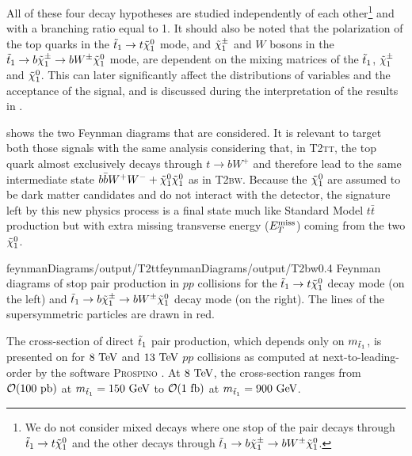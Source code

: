     All of these four decay hypotheses are studied independently
    of each other\footnote{We do not consider mixed decays where one stop of the pair
    decays through $\tilde{t}_1 \rightarrow t \tilde{\chi}_1^0$ and the other decays through
    $\tilde{t}_1 \rightarrow b \tilde{\chi}_1^\pm \rightarrow b W^{\pm} \tilde{\chi}_1^0$.} and with a
    branching ratio equal to 1. It should also be noted that the polarization of the
    top quarks in the $\tilde{t}_1 \rightarrow t \tilde{\chi}_1^0$ mode, and $\tilde{\chi}_1^\pm$ and
    $W$ bosons in the $\tilde{t}_1 \rightarrow b \tilde{\chi}_1^\pm \rightarrow b W^{\pm}
    \tilde{\chi}_1^0$ mode, are dependent on the mixing matrices of the $\tilde{t}_1$, $\tilde{\chi}_1^\pm$
    and $\tilde{\chi}_1^0$. This can later significantly affect the distributions of
    variables and the acceptance of the signal, and is discussed during the
    interpretation of the results in .

     shows the two Feynman diagrams that are
    considered. It is relevant to target both those signals with the same analysis
    considering that, in \textsc{T2tt}, the top quark almost exclusively decays
    through $t \rightarrow b W^+$ and therefore lead to the same intermediate state
    $b \bar{b} W^+ W^- + \tilde{\chi}_1^0 \tilde{\chi}_1^0$ as in \textsc{T2bw}. Because the
    $\tilde{\chi}_1^0$ are assumed to be dark matter candidates and do not interact with
    the detector, the signature left by this new physics process is a final state much
    like Standard Model $t\bar{t}$ production but with extra missing transverse energy
    ($E_T^\text{miss}$) coming from the two $\tilde{\chi}_1^0$.

                     {feynmanDiagrams/output/T2tt}{feynmanDiagrams/output/T2bw}{0.4}
                     {Feynman diagrams of stop pair production in $pp$ collisions for the
                     $\tilde{t}_1 \rightarrow t \tilde{\chi}_1^0$ decay mode (on the left) and
                     $\tilde{t}_1 \rightarrow b \tilde{\chi}_1^\pm \rightarrow b W^{\pm} \tilde{\chi}_1^0$ decay mode
                     (on the right). The lines of the supersymmetric particles are drawn in red.}

    The cross-section of direct $\tilde{t}_1$ pair production, which depends only on $m_{\tilde{t}_1}$,
    is presented on  for $8~\text{TeV}$ and $13~\text{TeV}$ $pp$ collisions
    as computed at next-to-leading-order by the software \textsc{Prospino} \cite{Prospino}.
    At $8~\text{TeV}$, the cross-section ranges from $\mathcal{O}(100~\text{pb})$ at $m_{\tilde{t}_1} =
    150~\text{GeV}$ to $\mathcal{O}(1~\text{fb})$ at $m_{\tilde{t}_1} = 900 ~\text{GeV}$.

